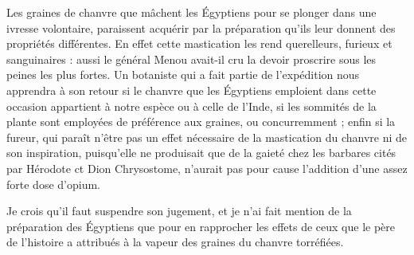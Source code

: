 \documentclass[a4paper, 11pt, oneside, polutonikogreek, french]{article}
\begin{document}
Les graines de chanvre que mâchent les Égyptiens pour se plonger dans une ivresse volontaire, paraissent acquérir par la préparation qu'ils leur donnent des propriétés différentes. En effet cette mastication les rend querelleurs, furieux et sanguinaires : aussi le général Menou avait-il cru la devoir proscrire sous les peines les plus fortes. Un botaniste qui a fait partie de l'expédition nous apprendra à son retour si le chanvre que les Égyptiens emploient dans cette occasion appartient à notre espèce ou à celle de l'Inde, si les sommités de la plante sont employées de préférence aux graines, ou concurremment ; enfin si la fureur, qui paraît n'être pas un effet nécessaire de la mastication du chanvre ni de son inspiration, puisqu'elle ne produisait que de la gaieté chez les barbares cités par Hérodote ct Dion Chrysostome, n'aurait pas pour cause l'addition d'une assez forte dose d'opium.

Je crois qu'il faut suspendre son jugement, et je n'ai fait mention de la préparation des Égyptiens que pour en rapprocher les effets de ceux que le père de l'histoire a attribués à la vapeur des graines du chanvre torréfiées.
\end{document}
